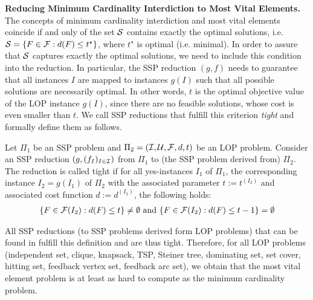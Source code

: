 \par{\bf Reducing Minimum Cardinality Interdiction to Most Vital Elements.}
The concepts of minimum cardinality interdiction and most vital elements coincide if and only of the set $\mathcal{S}$ contains exactly the optimal solutions, i.e. $\mathcal{S} = \{F \in \mathcal{F} : d(F) \leq t^\star\}$, where $t^\star$ is optimal (i.e. minimal).
In order to assure that $\mathcal{S}$ captures exactly the optimal solutions, we need to include this condition into the reduction.
In particular, the SSP reduction $(g, f)$ needs to guarantee that all instances $I$ are mapped to instances $g(I)$ such that all possible solutions are necessarily optimal.
In other words, $t$ is the optimal objective value of the LOP instance $g(I)$, since there are no feasible solutions, whose cost is even smaller than $t$.
We call SSP reductions that fulfill this criterion \emph{tight} and formally define them as follows.

\begin{definition}
    Let $\Pi_1$ be an SSP problem and $\Pi_2 = (\mathcal{I}, \mathcal{U}, \mathcal{F}, d, t)$ be an LOP problem.
    Consider an SSP reduction $(g, (f_I)_{I \in \mathcal{I}})$ from $\Pi_1$ to (the SSP problem derived from) $\Pi_2$. 
    The reduction is called tight if for all yes-instances $I_1$ of $\Pi_1$, the corresponding instance $I_2 = g(I_1)$ of $\Pi_2$ with the associated parameter $t := t^{(I_2)}$ and associated cost function $d := d^{(I_2)}$, the following holds:
    \begin{align}
        \{  F \in \mathcal{F}(I_2) : d(F) \leq t  \} \neq \emptyset \text{ and } \{  F \in \mathcal{F}(I_2) : d(F) \leq t - 1 \} = \emptyset
    \end{align}
\end{definition}

All SSP reductions (to SSP problems derived form LOP problems) that can be found in \cite{gruene2024completeness} fulfill this definition and are thus tight.
Therefore, for all LOP problems (independent set, clique, knapsack, TSP, Steiner tree, dominating set, set cover, hitting set, feedback vertex set, feedback arc set), we obtain that the most vital element problem is at least as hard to compute as the minimum cardinality problem.

